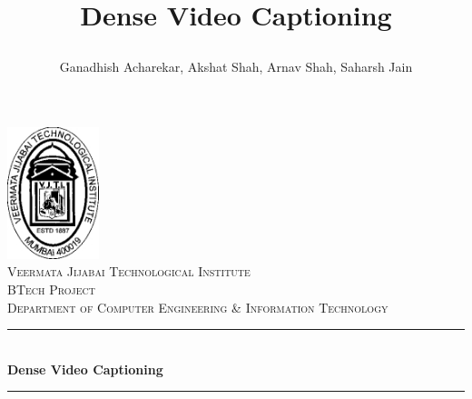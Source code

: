 \documentclass[]{article}
\title{
	\incl

	Dense Video Captioning
}
\author{Ganadhish Acharekar, Akshat Shah, Arnav Shah, Saharsh Jain}
\begin{document}

\begin{titlepage} %
	\newcommand{\HRule}{\rule{\linewidth}{0.5mm}} %
	
	\center %
	

	\includegraphics[width=0.2\textwidth]{assets/img/vjti.png}\\[1cm] %

	\textsc{\LARGE Veermata Jijabai Technological Institute}\\[1.5cm] %
	
	\textsc{\Large BTech Project}\\[0.5cm] %
	
	\textsc{\large Department of Computer Engineering \& Information Technology}\\[0.5cm] %
	
	
	\HRule\\[0.4cm]
	
	{\huge\bfseries Dense Video Captioning}\\[0.4cm] %
	
	\HRule\\[1.5cm]
	
	

\end{titlepage}
\end{document}
